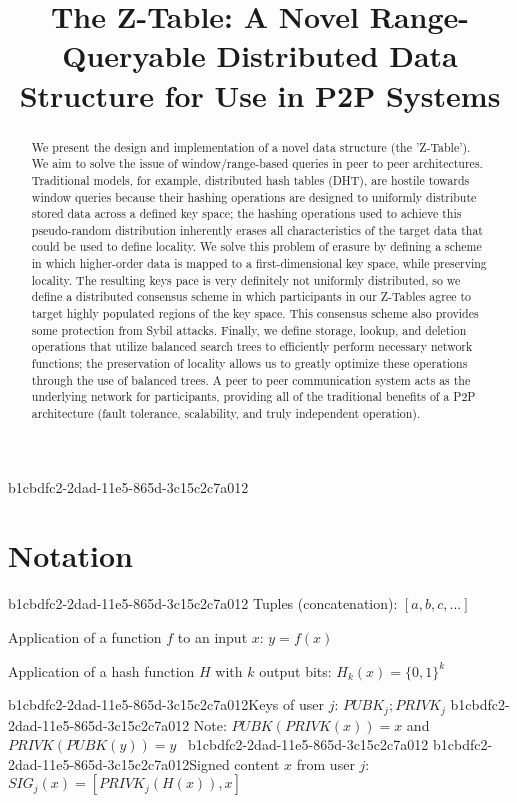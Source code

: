 \documentclass[12pt]{article}
\title{The Z-Table: A Novel Range-Queryable Distributed Data Structure for Use in P2P Systems}
\begin{document}
\maketitle
b1cbdfc2-2dad-11e5-865d-3c15c2c7a012
\begin{abstract}
We present the design and implementation of a novel data structure (the 'Z-Table'). We aim to solve the issue of window/range-based queries in peer to peer architectures. Traditional models, for example,  distributed hash tables (DHT), are hostile towards window queries because their hashing operations are designed to uniformly distribute stored data across a defined key space; the hashing operations used to achieve this pseudo-random distribution inherently erases all characteristics of the target data that could be used to define locality. We solve this problem of erasure by defining a scheme in which higher-order data is mapped to a first-dimensional key space, while preserving locality. The resulting keys pace is very definitely not uniformly distributed, so we define a distributed consensus scheme in which participants in our Z-Tables agree to target highly populated regions of the key space. This consensus scheme also provides some protection from Sybil attacks. Finally, we define storage, lookup, and deletion operations that utilize balanced search trees to efficiently perform necessary network functions; the preservation of locality allows us to greatly optimize these operations through the use of balanced trees. A peer to peer communication system acts as the underlying network for participants, providing all of the traditional benefits of a P2P architecture (fault tolerance, scalability, and truly independent operation).
\end{abstract}

\section{Notation}
b1cbdfc2-2dad-11e5-865d-3c15c2c7a012
Tuples (concatenation): $[a,b,c,...]$

Application of a function $f$ to an input $x$: $y=f(x)$

Application of a hash function $H$ with $k$ output bits: $H_{k}(x) = \{0,1\}^k$

b1cbdfc2-2dad-11e5-865d-3c15c2c7a012Keys of user $j$: $ PUBK_j; PRIVK_j $
b1cbdfc2-2dad-11e5-865d-3c15c2c7a012
Note: $PUBK(PRIVK(x)) = x$ and $PRIVK(PUBK(y)) = y$~
b1cbdfc2-2dad-11e5-865d-3c15c2c7a012
b1cbdfc2-2dad-11e5-865d-3c15c2c7a012Signed content $x$ from user $j$: $SIG_j(x) = \left[ PRIVK_j( H(x) ), x \right]$
\end{document}
